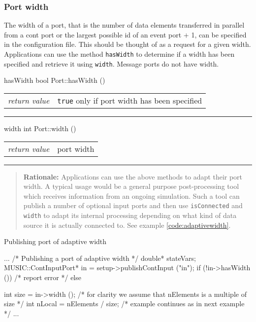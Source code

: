 \documentclass[a4paper,twoside]{report}
\makeatletter
\newenvironment{rationale}%
{\par\begin{quote}\textbf{Rationale:}}%
{\par\end{quote}}
\newenvironment{parameters}%
{\begin{tabular}{@{\hspace{2em}}lp{0.6\textwidth}}}%
{\end{tabular}\par\vspace{1mm}\par\hrule\par\vspace{5mm}}
\makeatother
\begin{document}
\subsubsection{Port width}
\label{sec:width}

The width of a port, that is the number of data
elements transferred in parallel from a cont port or the largest
possible id of an event port $+$ 1, can be specified in the
configuration file.  This should be thought of as a request for a
given width.  Applications can use the method \lstinline|hasWidth| to
determine if a width has been specified and retrieve it using
\lstinline|width|.  Message ports do not have width.

\begin{head}{hasWidth}
  bool Port::hasWidth ()
\end{head}
\begin{parameters}
  \emph{return value} & \lstinline|true| only if port width has been
                         specified \\
\end{parameters}

\begin{head}{width}
  int Port::width ()
\end{head}
\begin{parameters}
  \emph{return value} & port width \\
\end{parameters}

\begin{rationale}
  Applications can use the above methods to adapt their port width.  A
  typical usage would be a general purpose post-processing tool which
  receives information from an ongoing simulation.  Such a tool can
  publish a number of optional input ports and then use
  \lstinline|isConnected| and \lstinline|width| to adapt its internal
  processing depending on what kind of data source it is actually
  connected to.  See example \ref{code:adaptivewidth}.
\end{rationale}


\begin{code}{Publishing port of adaptive width\label{code:adaptivewidth}}
{
  ...
  /* Publishing a port of adaptive width */
  double* stateVars;
  MUSIC::ContInputPort* in =
     setup->publishContInput ("in");
  if (!in->hasWidth ())
    /* report error */
  else
    {
      int size = in->width ();
      /* for clarity we assume that nElements
         is a multiple of size */
      int nLocal = nElements / size;
      /* example continues as in next example */
      ...
      
    }
}
\end{code}
\end{document}

